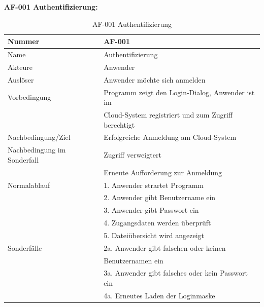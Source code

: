 \documentclass[12pt,a4paper,bibliography=totocnumbered,listof=totocnumbered]{scrartcl}
\begin{document}
\begin{appendix}
\textbf{AF-001 Authentifizierung:}
\begin{table}[!h]
	\centering
	\begin{tabular}{|l|l|}
		\hline
		Nummer & AF-001\\
		\hline
		Name & Authentifizierung\\
		\hline
		Akteure & Anwender\\
		\hline
		Auslöser & Anwender möchte sich anmelden\\
		\hline
		Vorbedingung & Programm zeigt den Login-Dialog, Anwender ist im \\ &  Cloud-System registriert und zum Zugriff berechtigt\\
		\hline
		Nachbedingung/Ziel & Erfolgreiche Anmeldung am Cloud-System \\
		\hline
		Nachbedingung im Sonderfall & Zugriff verweigtert\\ & Erneute Aufforderung zur Anmeldung\\
		\hline
		Normalablauf & 1. Anwender strartet Programm \\ & 2. Anwender gibt Benutzername ein \\ & 3. Anwender gibt Passwort ein \\ & 4. Zugangsdaten werden überprüft \\ & 5. 				Dateiübersicht wird angezeigt \\
		\hline
		Sonderfälle & 2a. Anwender gibt falschen oder keinen \\ & Benutzernamen ein \\ & 3a. Anwender gibt falsches oder kein Passwort ein \\ & 4a. Erneutes Laden der Loginmaske\\
		\hline
	\end{tabular}
	\caption{AF-001 Authentifizierung}
	\label{tab:AF-001 Authentifizierung}
\end{table}
\pagebreak


\end{appendix}
\end{document}
